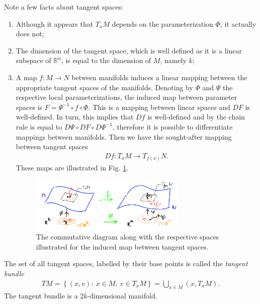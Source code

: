 \begin{remark}[]
	Note a few facts about tangent spaces:
	\begin{enumerate}
		\item Although it appears that $T_{x}M$ depends on the parameterization $\Phi$, it actually does not;
		\item The dimension of the tangent space, which is well defined as it is a linear subspace of $\mathbb{R}^{n}$, is equal to the dimension of $M$, namely $k$;
		\item A map $f:M\to N$ between manifolds induces a linear mapping between the appropriate tangent spaces of the manifolds. Denoting by $\Phi$ and $\Psi$ the respective local parameterizations, the induced map between parameter spaces is $F= \Psi^{-1} \circ f \circ \Phi$. This is a mapping between linear spaces and $DF$ is well-defined. In turn, this implies that $Df$ is well-defined and by the chain rule is equal to $D\Psi \circ DF \circ D\Phi^{-1}$, therefore it is possible to differentiate mappings between manifolds. Then we have the sought-after mapping between tangent spaces 
			\begin{align}
				Df: T_{x}M \to T_{f(x)}N.
			\end{align}
			These maps are illustrated in Fig. \ref{fig:induced_tangent_map}.
			\begin{figure}[h!]
				\centering
				\includegraphics[width=0.7\textwidth]{figures/ch9/7induced_tangent_map.png}
				\caption{The commutative diagram along with the respective spaces illustrated for the induced map between tangent spaces.}
				\label{fig:induced_tangent_map}
			\end{figure}
	\end{enumerate}
\end{remark}

\begin{definition}
	The set of all tangent spaces, labelled by their base points is called the \emph{tangent bundle}
	\begin{align}
		\boxed{
			TM = \left\{ (x,v):\ x\in M,\ v\in T_{x}M \right\} = \bigcup_{x\in M}(x, T_{x}M).
		}
	\end{align}
The tangent bundle is a $2k$-dimensional manifold.	
\end{definition}

